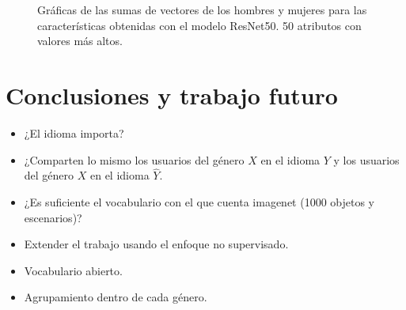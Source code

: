 \documentclass[runningheads]{llncs}
\begin{document}
\begin{figure}[!h]
\caption{Gráficas de las sumas de vectores de los hombres y mujeres para las características obtenidas con el modelo ResNet50. 50 atributos con valores más altos.}
\label{img-resnet-freqs}
\end{figure}







\section{Conclusiones y trabajo futuro}

\begin{itemize}
    \item ¿El idioma importa? 
    \item ¿Comparten lo mismo los usuarios del género $X$ en el idioma
    $Y$ y los usuarios del género $X$ en el idioma $\hat{Y}$.
    \item ¿Es suficiente el vocabulario con el que cuenta imagenet
    (1000 objetos y escenarios)?
    \item Extender el trabajo usando el enfoque no supervisado.
    \item Vocabulario abierto.
    \item Agrupamiento dentro de cada género.
\end{itemize}



\end{document}

